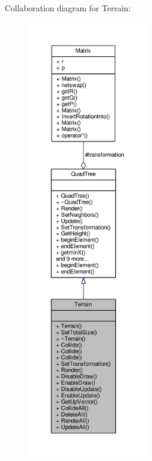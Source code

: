 Collaboration diagram for Terrain\+:
\nopagebreak
\begin{figure}[H]
\begin{center}
\leavevmode
\includegraphics[height=550pt]{d6/df5/classTerrain__coll__graph}
\end{center}
\end{figure}
